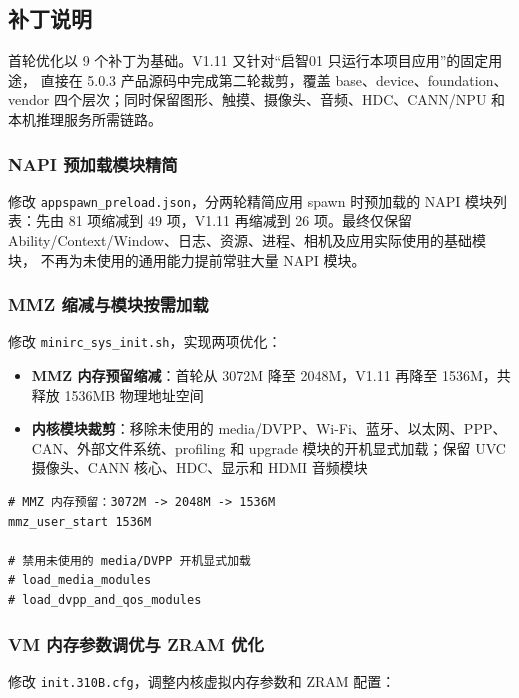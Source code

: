 \subsection{补丁说明}

首轮优化以 9 个补丁为基础。V1.11 又针对“启智01 只运行本项目应用”的固定用途，
直接在 5.0.3 产品源码中完成第二轮裁剪，覆盖 base、device、foundation、vendor
四个层次；同时保留图形、触摸、摄像头、音频、HDC、CANN/NPU 和本机推理服务所需链路。

\subsubsection{NAPI 预加载模块精简}

修改 \texttt{appspawn\_preload.json}，分两轮精简应用 spawn 时预加载的 NAPI
模块列表：先由 81 项缩减到 49 项，V1.11 再缩减到 26 项。最终仅保留
Ability/Context/Window、日志、资源、进程、相机及应用实际使用的基础模块，
不再为未使用的通用能力提前常驻大量 NAPI 模块。

\subsubsection{MMZ 缩减与模块按需加载}

修改 \texttt{minirc\_sys\_init.sh}，实现两项优化：

\begin{itemize}
  \item \textbf{MMZ 内存预留缩减}：首轮从 3072M 降至 2048M，V1.11 再降至 1536M，共释放 1536MB 物理地址空间
  \item \textbf{内核模块裁剪}：移除未使用的 media/DVPP、Wi-Fi、蓝牙、以太网、PPP、CAN、外部文件系统、profiling 和 upgrade 模块的开机显式加载；保留 UVC 摄像头、CANN 核心、HDC、显示和 HDMI 音频模块
\end{itemize}

\begin{lstlisting}[style=shell, caption={MMZ 缩减与模块按需加载}]
# MMZ 内存预留：3072M -> 2048M -> 1536M
mmz_user_start 1536M

# 禁用未使用的 media/DVPP 开机显式加载
# load_media_modules
# load_dvpp_and_qos_modules
\end{lstlisting}

\subsubsection{VM 内存参数调优与 ZRAM 优化}

修改 \texttt{init.310B.cfg}，调整内核虚拟内存参数和 ZRAM 配置：


